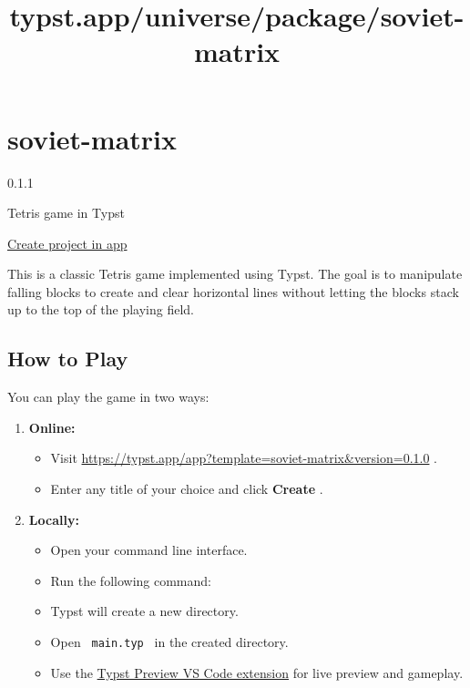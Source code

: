 \title{typst.app/universe/package/soviet-matrix}

\label{banner}
\label{template-thumbnail}

\section{soviet-matrix}\label{soviet-matrix}

{ 0.1.1 }

Tetris game in Typst

\href{/app?template=soviet-matrix&version=0.1.1}{Create project in app}

\label{readme}
This is a classic Tetris game implemented using Typst. The goal is to
manipulate falling blocks to create and clear horizontal lines without
letting the blocks stack up to the top of the playing field.


\subsection{How to Play}\label{how-to-play}

You can play the game in two ways:

\begin{enumerate}
\item
  \textbf{Online:}

  \begin{itemize}
  \tightlist
  \item
    Visit
    \url{https://typst.app/app?template=soviet-matrix&version=0.1.0} .
  \item
    Enter any title of your choice and click \textbf{Create} .
  \end{itemize}
\item
  \textbf{Locally:}

  \begin{itemize}
  \item
    Open your command line interface.
  \item
    Run the following command:

\begin{Shaded}
\begin{Highlighting}[]
\end{Highlighting}
\end{Shaded}
  \item
    Typst will create a new directory.
  \item
    Open \texttt{\ main.typ\ } in the created directory.
  \item
    Use the
    \href{https://marketplace.visualstudio.com/items?itemName=mgt19937.typst-preview}{Typst
    Preview VS Code extension} for live preview and gameplay.
  \end{itemize}
\end{enumerate}

